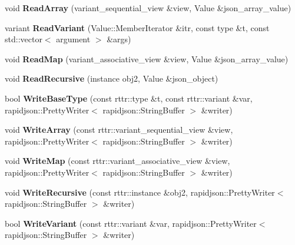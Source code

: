 \begin{DoxyCompactItemize}
void {\bfseries Read\+Array} (variant\+\_\+sequential\+\_\+view \&view, Value \&json\+\_\+array\+\_\+value)
\item 
\mbox{\label{namespaceCantReflect_a6d58793a5969035943b6e865f69e7a04}} 
variant {\bfseries Read\+Variant} (Value\+::\+Member\+Iterator \&itr, const type \&t, const std\+::vector$<$ argument $>$ \&args)
\item 
\mbox{\label{namespaceCantReflect_ab489df42e2ef816ab6d2271b6fbe3d46}} 
void {\bfseries Read\+Map} (variant\+\_\+associative\+\_\+view \&view, Value \&json\+\_\+array\+\_\+value)
\item 
\mbox{\label{namespaceCantReflect_ad9e924f4061a7b0bb76d1a31662aa5b4}} 
void {\bfseries Read\+Recursive} (instance obj2, Value \&json\+\_\+object)
\item 
\mbox{\label{namespaceCantReflect_aa8550db7b5e7de43a09110862572d612}} 
bool {\bfseries Write\+Base\+Type} (const rttr\+::type \&t, const rttr\+::variant \&var, rapidjson\+::\+Pretty\+Writer$<$ rapidjson\+::\+String\+Buffer $>$ \&writer)
\item 
\mbox{\label{namespaceCantReflect_ab1e383156bbbd6a7b8740a906ead18d2}} 
void {\bfseries Write\+Array} (const rttr\+::variant\+\_\+sequential\+\_\+view \&view, rapidjson\+::\+Pretty\+Writer$<$ rapidjson\+::\+String\+Buffer $>$ \&writer)
\item 
\mbox{\label{namespaceCantReflect_ac80b637fe19ac34abdc9d03c36380fd6}} 
void {\bfseries Write\+Map} (const rttr\+::variant\+\_\+associative\+\_\+view \&view, rapidjson\+::\+Pretty\+Writer$<$ rapidjson\+::\+String\+Buffer $>$ \&writer)
\item 
\mbox{\label{namespaceCantReflect_aa8b04ebf3af344e3a5184c9975ccb0e6}} 
void {\bfseries Write\+Recursive} (const rttr\+::instance \&obj2, rapidjson\+::\+Pretty\+Writer$<$ rapidjson\+::\+String\+Buffer $>$ \&writer)
\item 
\mbox{\label{namespaceCantReflect_af7cf9fe2e409091304d3578aaf003c48}} 
bool {\bfseries Write\+Variant} (const rttr\+::variant \&var, rapidjson\+::\+Pretty\+Writer$<$ rapidjson\+::\+String\+Buffer $>$ \&writer)

\end{DoxyCompactItemize}

